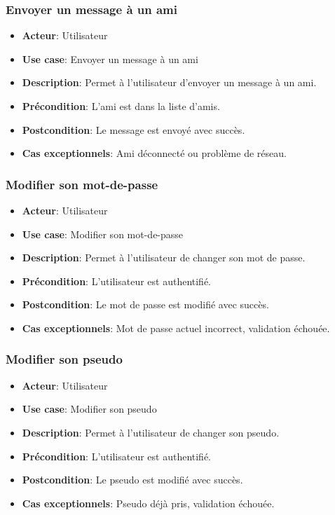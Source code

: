 \documentclass{article}
\begin{document}
\subsubsection{Envoyer un message à un ami}
\begin{itemize}
    \item \textbf{Acteur}: Utilisateur
    \item \textbf{Use case}: Envoyer un message à un ami
    \item \textbf{Description}: Permet à l'utilisateur d'envoyer un message à un ami.
    \item \textbf{Précondition}: L'ami est dans la liste d'amis.
    \item \textbf{Postcondition}: Le message est envoyé avec succès.
    \item \textbf{Cas exceptionnels}: Ami déconnecté ou problème de réseau.
\end{itemize}

\subsubsection{Modifier son mot-de-passe}
\begin{itemize}
    \item \textbf{Acteur}: Utilisateur
    \item \textbf{Use case}: Modifier son mot-de-passe
    \item \textbf{Description}: Permet à l'utilisateur de changer son mot de passe.
    \item \textbf{Précondition}: L'utilisateur est authentifié.
    \item \textbf{Postcondition}: Le mot de passe est modifié avec succès.
    \item \textbf{Cas exceptionnels}: Mot de passe actuel incorrect, validation échouée.
\end{itemize}

\subsubsection{Modifier son pseudo}
\begin{itemize}
    \item \textbf{Acteur}: Utilisateur
    \item \textbf{Use case}: Modifier son pseudo
    \item \textbf{Description}: Permet à l'utilisateur de changer son pseudo.
    \item \textbf{Précondition}: L'utilisateur est authentifié.
    \item \textbf{Postcondition}: Le pseudo est modifié avec succès.
    \item \textbf{Cas exceptionnels}: Pseudo déjà pris, validation échouée.
\end{itemize}
\end{document}
